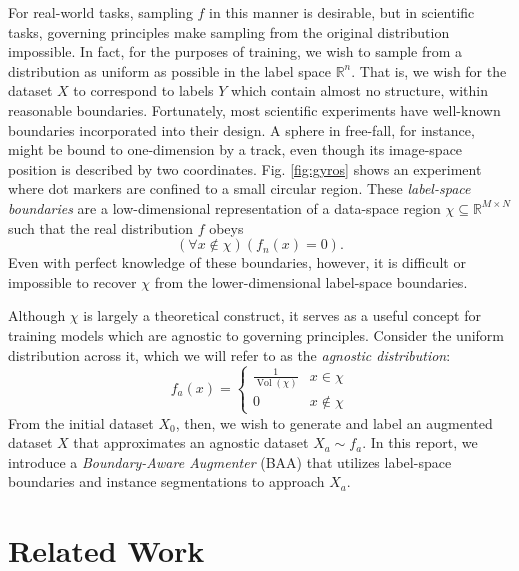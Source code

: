 \documentclass[10pt, journal]{IEEEtran}
\DeclareMathOperator{\vol}{Vol}
\begin{document}
For real-world tasks, sampling $f$ in this manner is desirable, but in
scientific tasks, governing principles make sampling from the original
distribution impossible. In fact, for the purposes of training, we wish to
sample from a distribution as uniform as possible in the label space
$\mathbb{R}^n$. That is, we wish for the dataset $X$ to correspond to labels $Y$
which contain almost no structure, within reasonable boundaries. Fortunately,
most scientific experiments have well-known boundaries incorporated into their
design. A sphere in free-fall, for instance, might be bound to one-dimension by
a track, even though its image-space position is described by two
coordinates. Fig. \ref{fig:gyros} shows an experiment where dot markers are
confined to a small circular region. These \emph{label-space boundaries} are a
low-dimensional representation of a data-space region
$\chi \subseteq \mathbb{R}^{M\times N}$ such that the real distribution $f$
obeys
\[ (\forall x \not\in \chi)(f_n(x) = 0). \] Even with perfect knowledge of these
boundaries, however, it is difficult or impossible to recover $\chi$ from the
lower-dimensional label-space boundaries.

Although $\chi$ is largely a theoretical construct, it serves as a useful
concept for training models which are agnostic to governing principles. Consider
the uniform distribution across it, which we will refer to as the \emph{agnostic
  distribution}:
\[ f_a(x) =
  \begin{cases}
    \frac{1}{\vol(\chi)} & x \in \chi \\
    0 & x \not\in \chi
  \end{cases}
\] From the initial dataset $X_0$, then, we wish to generate and label an
augmented dataset $X$ that approximates an agnostic dataset $X_a \sim f_a$. In
this report, we introduce a \emph{Boundary-Aware Augmenter} (BAA) that utilizes
label-space boundaries and instance segmentations to approach $X_a$.

\section{Related Work}
\label{sec:related-work}

\end{document}
